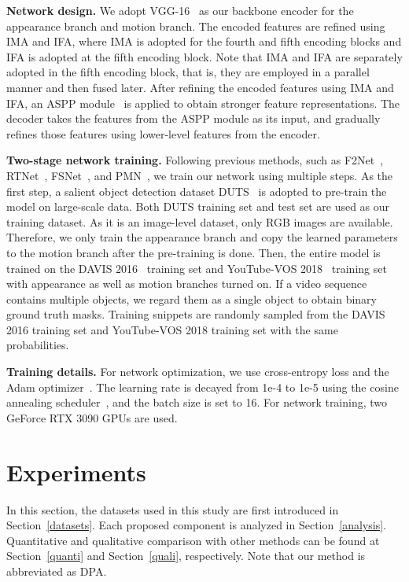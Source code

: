 \documentclass[10pt,twocolumn,letterpaper]{article}
\begin{document}
\vspace{1mm}
\noindent\textbf{Network design.} We adopt VGG-16~\cite{vgg} as our backbone encoder for the appearance branch and motion branch. The encoded features are refined using IMA and IFA, where IMA is adopted for the fourth and fifth encoding blocks and IFA is adopted at the fifth encoding block. Note that IMA and IFA are separately adopted in the fifth encoding block, that is, they are employed in a parallel manner and then fused later. After refining the encoded features using IMA and IFA, an ASPP module~\cite{ASPP} is applied to obtain stronger feature representations. The decoder takes the features from the ASPP module as its input, and gradually refines those features using lower-level features from the encoder.



\vspace{1mm}
\noindent\textbf{Two-stage network training.} Following previous methods, such as F2Net~\cite{F2Net}, RTNet~\cite{RTNet}, FSNet~\cite{FSNet}, and PMN~\cite{PMN}, we train our network using multiple steps. As the first step, a salient object detection dataset DUTS~\cite{DUTS} is adopted to pre-train the model on large-scale data. Both DUTS training set and test set are used as our training dataset. As it is an image-level dataset, only RGB images are available. Therefore, we only train the appearance branch and copy the learned parameters to the motion branch after the pre-training is done. Then, the entire model is trained on the DAVIS 2016~\cite{DAVIS} training set and YouTube-VOS 2018~\cite{YTVOS} training set with appearance as well as motion branches turned on. If a video sequence contains multiple objects, we regard them as a single object to obtain binary ground truth masks. Training snippets are randomly sampled from the DAVIS 2016 training set and YouTube-VOS 2018 training set with the same probabilities.


\vspace{1mm}
\noindent\textbf{Training details.} For network optimization, we use cross-entropy loss and the Adam optimizer~\cite{adam}. The learning rate is decayed from 1e-4 to 1e-5 using the cosine annealing scheduler~\cite{cosine}, and the batch size is set to 16. For network training, two GeForce RTX 3090 GPUs are used. 


\section{Experiments}
In this section, the datasets used in this study are first introduced in Section~\ref{datasets}. Each proposed component is analyzed in Section~\ref{analysis}. Quantitative and qualitative comparison with other methods can be found at Section~\ref{quanti} and Section~\ref{quali}, respectively. Note that our method is abbreviated as DPA. 
\end{document}
